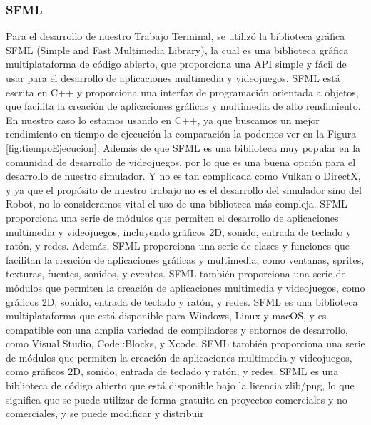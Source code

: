 \subsubsection{SFML}
    Para el desarrollo de nuestro Trabajo Terminal, se utiliz\'o la biblioteca gr\'afica SFML (Simple and Fast Multimedia Library), 
        la cual es una biblioteca gr\'afica multiplataforma de c\'odigo abierto, que proporciona una API simple y f\'acil de usar 
        para el desarrollo de aplicaciones multimedia y videojuegos. SFML est\'a escrita en C++ y proporciona una interfaz de 
        programaci\'on orientada a objetos, que facilita la creaci\'on de aplicaciones gr\'aficas y multimedia de alto rendimiento.
    \vskip 0.5cm
    En nuestro caso lo estamos usando en C++, ya que buscamos un mejor rendimiento en tiempo de ejecuci\'on la comparaci\'on la podemos ver
        en la Figura \ref{fig:tiempoEjecucion}. Adem\'as de que SFML es una biblioteca muy popular en la comunidad de desarrollo de videojuegos, por lo que es una buena opci\'on 
        para el desarrollo de nuestro simulador. Y no es tan complicada como Vulkan o DirectX, y ya que el prop\'osito de nuestro trabajo 
        no es el desarrollo del simulador sino del Robot, no lo consideramos vital el uso de una biblioteca m\'as compleja.
    \vskip 0.5cm
    SFML proporciona una serie de m\'odulos que permiten el desarrollo de aplicaciones multimedia y videojuegos, 
        incluyendo gr\'aficos 2D, sonido, entrada de teclado y rat\'on, y redes. Adem\'as, SFML proporciona una serie de 
        clases y funciones que facilitan la creaci\'on de aplicaciones gr\'aficas y multimedia, como ventanas, sprites, 
        texturas, fuentes, sonidos, y eventos. SFML tambi\'en proporciona una serie de m\'odulos que permiten la creaci\'on 
        de aplicaciones multimedia y videojuegos, como gr\'aficos 2D, sonido, entrada de teclado y rat\'on, y redes.
    \vskip 0.5cm
    SFML es una biblioteca multiplataforma que est\'a disponible para Windows, Linux y macOS, y es compatible con una 
        amplia variedad de compiladores y entornos de desarrollo, como Visual Studio, Code::Blocks, y Xcode. SFML tambi\'en 
        proporciona una serie de m\'odulos que permiten la creaci\'on de aplicaciones multimedia y videojuegos, como gr\'aficos 
        2D, sonido, entrada de teclado y rat\'on, y redes.
    \vskip 0.5cm
    SFML es una biblioteca de c\'odigo abierto que est\'a disponible bajo la licencia zlib/png, lo que significa que 
        se puede utilizar de forma gratuita en proyectos comerciales y no comerciales, y se puede modificar y distribuir 
